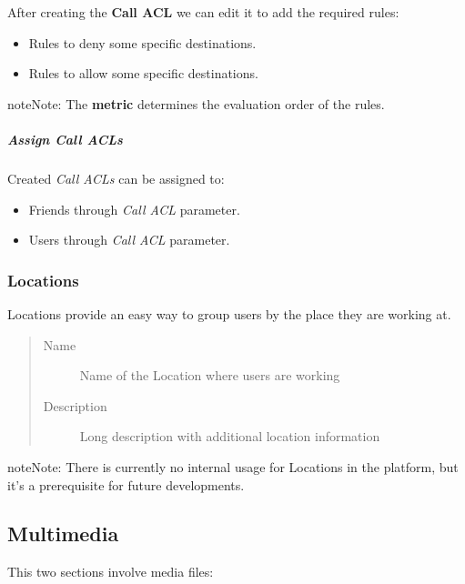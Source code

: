 \documentclass[letterpaper,10pt,english]{sphinxmanual}
\begin{document}
After creating the \textbf{Call ACL} we can edit it to add the required rules:
\begin{itemize}
\item {} 
Rules to deny some specific destinations.

\item {} 
Rules to allow some specific destinations.

\end{itemize}

\begin{notice}{note}{Note:}
The \textbf{metric} determines the evaluation order of the rules.
\end{notice}


\subparagraph{Assign Call ACLs}
\label{administration_portal/client/vpbx/user_configuration/call_acls:assign-call-acls}
Created \emph{Call ACLs} can be assigned to:
\begin{itemize}
\item {} 
Friends through \emph{Call ACL} parameter.

\item {} 
Users through \emph{Call ACL} parameter.

\end{itemize}


\subsubsection{Locations}
\label{administration_portal/client/vpbx/user_configuration/locations::doc}\label{administration_portal/client/vpbx/user_configuration/locations:locations}
Locations provide an easy way to group users by the place they are working at.
\begin{quote}
\begin{description}
\item[{Name}] \leavevmode
Name of the Location where users are working

\item[{Description}] \leavevmode
Long description with additional location information

\end{description}
\end{quote}

\begin{notice}{note}{Note:}
There is currently no internal usage for Locations in the
platform, but it's a prerequisite for future developments.
\end{notice}


\subsection{Multimedia}
\label{administration_portal/client/vpbx/multimedia/index:multimedia}\label{administration_portal/client/vpbx/multimedia/index::doc}
This two sections involve media files:
\end{document}
